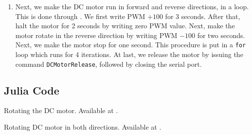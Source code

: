 \begin{enumerate}
  \item Next, we make the DC motor run in forward and reverse
        directions, in a loop.  This is done through
        .  We first write PWM $+100$ for 3
        seconds.  After that, halt the motor for 2 seconds by writing zero PWM value.  
        Next, make the motor rotate in the reverse direction by writing PWM $-100$ for two seconds.  
        Next, we make the motor stop for one second. This procedure is put in a {\tt for} loop which runs for 4 iterations.
        At last, we release the motor by issuing the command {\tt DCMotorRelease}, followed by closing the serial port. 
        
\end{enumerate}


\subsection{Julia Code}
\label{sec:dcmotor-julia-code}

\begin{juliacode}
  {Rotating the DC motor.  Available at
    .}
  \label{julia:dcmotor-clock}
  
\end{juliacode}

\begin{juliacode}
  {Rotating DC motor in both directions.  Available at
    .}
  \label{julia:dcmotor-both}
  
\end{juliacode}

\begin{juliacode}
  \label{julia:dcmotor-loop}
  
\end{juliacode}


